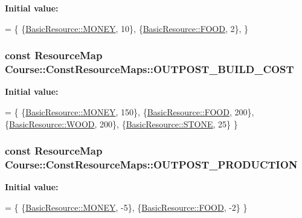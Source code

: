 {\bfseries Initial value\-:}
\begin{DoxyCode}
= \{
    \{\hyperlink{namespaceCourse_a02d49c04029594d4adba79b84bb85f65aff016add6bbbdbb44abf1d2d7f215ec0}{BasicResource::MONEY}, 10\},
    \{\hyperlink{namespaceCourse_a02d49c04029594d4adba79b84bb85f65a7018c47af38bfc1390a89e70b4cf4760}{BasicResource::FOOD}, 2\},
\}
\end{DoxyCode}
\hypertarget{namespaceCourse_1_1ConstResourceMaps_a0baa840c24b118a34043afeb268c4408}{
\subsubsection[{O\-U\-T\-P\-O\-S\-T\-\_\-\-B\-U\-I\-L\-D\-\_\-\-C\-O\-S\-T}]{\setlength{\rightskip}{0pt plus 5cm}const {\bf Resource\-Map} Course\-::\-Const\-Resource\-Maps\-::\-O\-U\-T\-P\-O\-S\-T\-\_\-\-B\-U\-I\-L\-D\-\_\-\-C\-O\-S\-T}}\label{namespaceCourse_1_1ConstResourceMaps_a0baa840c24b118a34043afeb268c4408}
{\bfseries Initial value\-:}
\begin{DoxyCode}
= \{
    \{\hyperlink{namespaceCourse_a02d49c04029594d4adba79b84bb85f65aff016add6bbbdbb44abf1d2d7f215ec0}{BasicResource::MONEY}, 150\},
    \{\hyperlink{namespaceCourse_a02d49c04029594d4adba79b84bb85f65a7018c47af38bfc1390a89e70b4cf4760}{BasicResource::FOOD}, 200\},
    \{\hyperlink{namespaceCourse_a02d49c04029594d4adba79b84bb85f65a87287be3009253b983ffb2e9f91eef22}{BasicResource::WOOD}, 200\},
    \{\hyperlink{namespaceCourse_a02d49c04029594d4adba79b84bb85f65a8598c3079c2be7785410e724cc190229}{BasicResource::STONE}, 25\}
\}
\end{DoxyCode}
\hypertarget{namespaceCourse_1_1ConstResourceMaps_ae91bf6e7a36ca76016f6d149e94a3e9d}{
\subsubsection[{O\-U\-T\-P\-O\-S\-T\-\_\-\-P\-R\-O\-D\-U\-C\-T\-I\-O\-N}]{\setlength{\rightskip}{0pt plus 5cm}const {\bf Resource\-Map} Course\-::\-Const\-Resource\-Maps\-::\-O\-U\-T\-P\-O\-S\-T\-\_\-\-P\-R\-O\-D\-U\-C\-T\-I\-O\-N}}\label{namespaceCourse_1_1ConstResourceMaps_ae91bf6e7a36ca76016f6d149e94a3e9d}
{\bfseries Initial value\-:}
\begin{DoxyCode}
= \{
    \{\hyperlink{namespaceCourse_a02d49c04029594d4adba79b84bb85f65aff016add6bbbdbb44abf1d2d7f215ec0}{BasicResource::MONEY}, -5\},
    \{\hyperlink{namespaceCourse_a02d49c04029594d4adba79b84bb85f65a7018c47af38bfc1390a89e70b4cf4760}{BasicResource::FOOD}, -2\}
\}
\end{DoxyCode}
